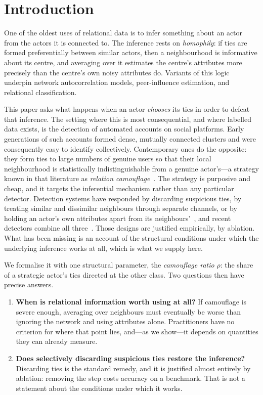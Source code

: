 \documentclass[../elsevier.tex]{subfiles}
\begin{document}
\section{Introduction}
\label{sec:intro}

One of the oldest uses of relational data is to infer something about an actor from
the actors it is connected to. The inference rests on \emph{homophily}: if ties are
formed preferentially between similar actors, then a neighbourhood is informative
about its centre, and averaging over it estimates the centre's attributes more
precisely than the centre's own noisy attributes do. Variants of this logic underpin
network autocorrelation models, peer-influence estimation, and relational
classification.

This paper asks what happens when an actor \emph{chooses} its ties in order to defeat
that inference. The setting where this is most consequential, and where labelled data
exists, is the detection of automated accounts on social platforms. Early generations
of such accounts formed dense, mutually connected clusters and were consequently easy
to identify collectively. Contemporary ones do the opposite: they form ties to large
numbers of genuine users so that their local neighbourhood is statistically
indistinguishable from a genuine actor's---a strategy known in that literature as
\emph{relation camouflage}~\citep{dou2020caregnn,cresci2020decade}. The strategy is
purposive and cheap, and it targets the inferential mechanism rather than any
particular detector. Detection systems have responded by discarding suspicious ties,
by treating similar and dissimilar neighbours through separate channels, or by holding
an actor's own attributes apart from its neighbours'~\citep{dou2020caregnn,he2025bothp},
and recent detectors combine all three~\citep{dang2026xhbot}. Those designs are
justified empirically, by ablation. What has been missing is an account of the
structural conditions under which the underlying inference works at all, which is what
we supply here.

We formalise it with one structural parameter, the \emph{camouflage ratio} $\rho$: the
share of a strategic actor's ties directed at the other class. Two questions then
have precise answers.

\begin{enumerate}
    \item \textbf{When is relational information worth using at all?} If camouflage
    is severe enough, averaging over neighbours must eventually be worse than
    ignoring the network and using attributes alone. Practitioners have no criterion
    for where that point lies, and---as we show---it depends on quantities they can
    already measure.
    \item \textbf{Does selectively discarding suspicious ties restore the
    inference?} Discarding ties is the standard remedy, and it is justified almost
    entirely by ablation: removing the step costs accuracy on a benchmark. That is
    not a statement about the conditions under which it works.
\end{enumerate}
\end{document}
